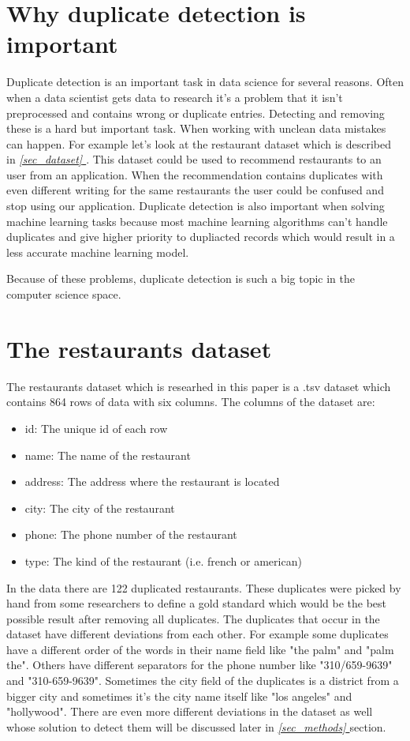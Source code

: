 \documentclass[conference]{IEEEtran}
\newcommand*{\fullref}[1]{\textit{\hyperref[{#1}]{\autoref*{#1} \nameref*{#1}}}}
\begin{document}
\section{Why duplicate detection is important}
Duplicate detection is an important task in data science for several reasons. Often when a data scientist gets data to research it's a problem that it isn't preprocessed and contains wrong or duplicate entries. Detecting and removing these is a hard but important task. When working with unclean data mistakes can happen. For example let's look at the restaurant dataset which is described in \fullref{sec_dataset}. This dataset could be used to recommend restaurants to an user from an application. When the recommendation contains duplicates with even different writing for the same restaurants the user could be confused and stop using our application. Duplicate detection is also important when solving machine learning tasks because most machine learning algorithms can't handle duplicates and give higher priority to dupliacted records which would result in a less accurate machine learning model.

Because of these problems, duplicate detection is such a big topic in the computer science space.
\section{The restaurants dataset} \label{sec_dataset}
The restaurants dataset which is researhed in this paper is a .tsv dataset which contains 864 rows of data with six columns. The columns of the dataset are: 
\begin{itemize}
	\item id: The unique id of each row
	\item name: The name of the restaurant
	\item address: The address where the restaurant is located
	\item city: The city of the restaurant
	\item phone: The phone number of the restaurant
	\item type: The kind of the restaurant (i.e. french or american)
\end{itemize}
In the data there are 122 duplicated restaurants. These duplicates were picked by hand from some researchers to define a gold standard which would be the best possible result after removing all duplicates. The duplicates that occur in the dataset have different deviations from each other. For example some duplicates have a different order of the words in their name field like "the palm" and "palm the". Others have different separators for the phone number like "310/659-9639" and "310-659-9639". Sometimes the city field of the duplicates is a district from a bigger city and sometimes it's the city name itself like "los angeles" and "hollywood". There are even more  different deviations in the dataset as well whose solution to detect them will be discussed later in \fullref{sec_methods} section.
\end{document}
